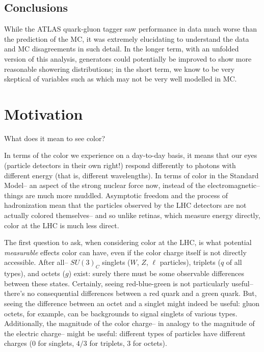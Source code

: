 \subsection{Conclusions}

While the ATLAS quark-gluon tagger saw performance in data much worse than the prediction of the \Pythia MC, it was extremely elucidating to understand the data and MC disagreements in such detail. In the longer term, with an unfolded version of this analysis, generators could potentially be improved to show more reasonable showering distributions; in the short term, we know to be very skeptical of variables such as \ntrk which may not be very well modelled in MC.

\section{Motivation}

What does it mean to see color?

In terms of the color we experience on a day-to-day basis, it means that our eyes (particle detectors in their own right!) respond differently to photons with different energy (that is, different wavelengths). In terms of color in the Standard Model-- an aspect of the strong nuclear force now, instead of the electromagnetic-- things are much more muddled. Asymptotic freedom and the process of hadronization mean that the particles observed by the LHC detectors are not actually colored themselves-- and so unlike retinas, which measure energy directly, color at the LHC is much less direct.

The first question to ask, when considering color at the LHC, is what potential \textit{measurable} effects color can have, even if the color charge itself is not directly accessible. After all-- $SU(3)_C$ singlets ($W$, $Z$, $\ell$ particles), triplets ($q$ of all types), and octets ($g$) exist: surely there must be some observable differences between these states. Certainly, seeing red-blue-green is not particularly useful-- there's no consequential differences between a red quark and a green quark. But, seeing the difference between an octet and a singlet might indeed be useful: gluon octets, for example, can be backgrounds to signal singlets of various types. Additionally, the magnitude of the color charge-- in analogy to the magnitude of the electric charge-- might be useful: different types of particles have different charges (0 for singlets, $4/3$ for triplets, $3$ for octets). 

